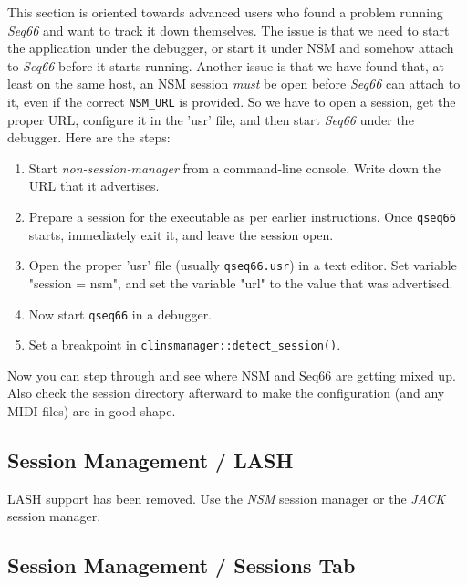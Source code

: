    This section is oriented towards advanced users who found a problem running
   \textsl{Seq66} and want to track it down themselves.  The issue is that we
   need to start the application under the debugger, or start it under NSM and
   somehow attach to \textsl{Seq66} before it starts running.  Another issue is
   that we have found that, at least on the same host, an NSM session
   \textsl{must} be open before \textsl{Seq66} can attach to it, even if the
   correct \texttt{NSM\_URL} is provided.
   So we have to open a session, get the proper URL, configure it in the 'usr'
   file, and then start \textsl{Seq66} under the debugger.
   Here are the steps:

   \begin{enumerate}
      \item Start \textsl{non-session-manager} from a command-line console.
         Write down the URL that it advertises.
      \item Prepare a session for the executable as per earlier instructions.
         Once \texttt{qseq66} starts, immediately exit it, and leave the session
         open.
      \item Open the proper 'usr' file (usually \texttt{qseq66.usr}) in a 
         text editor.  Set variable "session = nsm", and set the variable "url"
         to the value that was advertised.
      \item Now start \texttt{qseq66} in a debugger.
      \item Set a breakpoint in \texttt{clinsmanager::detect\_session()}.
   \end{enumerate}
   
   Now you can step through and see where NSM and Seq66 are getting mixed up.
   Also check the session directory afterward to make the configuration
   (and any MIDI files) are in good shape.

\subsection{Session Management / LASH}
\label{subsec:sessions_lash}

   LASH support has been removed.  Use the \textsl{NSM} session manager or
   the \textsl{JACK} session manager.

\subsection{Session Management / Sessions Tab}
\label{subsec:sessions_tab}

